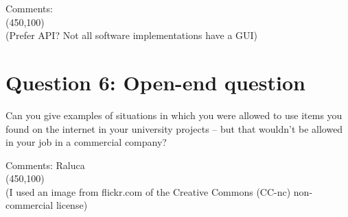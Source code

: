 \documentclass[12pt,a4paper,norsk]{article}
\begin{document}
\noindent Comments:\\
\framebox(450,100){}\\

(Prefer API? Not all software implementations have a GUI)

\section {Question 6: Open-end question} Can you give examples of situations in which you were allowed to use items you found on the internet in your university projects – but that wouldn’t be allowed in your job in a commercial company?


\noindent Comments: \heartsuit Raluca \\
\framebox(450,100){}\\

(I used an image from flickr.com of the Creative Commons (CC-nc) non-commercial license)
\end{document}
